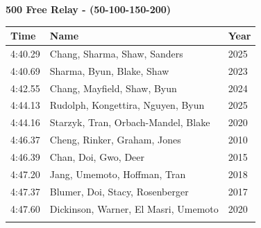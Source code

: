 \vspace{1.2em}
\noindent\begin{minipage}[t]{0.98\textwidth}
\centering
\textbf{\textcolor{teamprimary}{500 Free Relay - (50-100-150-200)}}\par
\vspace{0.5em}
\centering
\small
\renewcommand{\arraystretch}{1.0}
\setlength{\tabcolsep}{4pt}
\begin{tabular}{@{}p{4.5cm}p{8.5cm}p{2.5cm}@{}}
\toprule
\textbf{Time} & \textbf{Name} & \textbf{Year} \\
\midrule
4:40.29 & Chang, Sharma, Shaw, Sanders & 2025 \\
4:40.69 & Sharma, Byun, Blake, Shaw & 2023 \\
4:42.55 & Chang, Mayfield, Shaw, Byun & 2024 \\
4:44.13 & Rudolph, Kongettira, Nguyen, Byun & 2025 \\
4:44.16 & Starzyk, Tran, Orbach-Mandel, Blake & 2020 \\
4:46.37 & Cheng, Rinker, Graham, Jones & 2010 \\
4:46.39 & Chan, Doi, Gwo, Deer & 2015 \\
4:47.20 & Jang, Umemoto, Hoffman, Tran & 2018 \\
4:47.37 & Blumer, Doi, Stacy, Rosenberger & 2017 \\
4:47.60 & Dickinson, Warner, El Masri, Umemoto & 2020 \\
\bottomrule
\vspace{0.5em}
\end{tabular}
\end{minipage}
\clearpage
